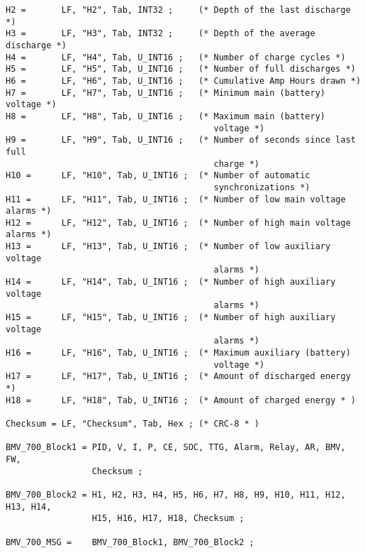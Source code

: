 \begin{verbatim}
H2 =       LF, "H2", Tab, INT32 ;     (* Depth of the last discharge *)
H3 =       LF, "H3", Tab, INT32 ;     (* Depth of the average discharge *)
H4 =       LF, "H4", Tab, U_INT16 ;   (* Number of charge cycles *)
H5 =       LF, "H5", Tab, U_INT16 ;   (* Number of full discharges *)
H6 =       LF, "H6", Tab, U_INT16 ;   (* Cumulative Amp Hours drawn *)
H7 =       LF, "H7", Tab, U_INT16 ;   (* Minimum main (battery) voltage *)
H8 =       LF, "H8", Tab, U_INT16 ;   (* Maximum main (battery) 
                                         voltage *)
H9 =       LF, "H9", Tab, U_INT16 ;   (* Number of seconds since last full
                                         charge *)
H10 =      LF, "H10", Tab, U_INT16 ;  (* Number of automatic 
                                         synchronizations *)
H11 =      LF, "H11", Tab, U_INT16 ;  (* Number of low main voltage alarms *)
H12 =      LF, "H12", Tab, U_INT16 ;  (* Number of high main voltage alarms *)
H13 =      LF, "H13", Tab, U_INT16 ;  (* Number of low auxiliary voltage 
                                         alarms *)
H14 =      LF, "H14", Tab, U_INT16 ;  (* Number of high auxiliary voltage 
                                         alarms *)
H15 =      LF, "H15", Tab, U_INT16 ;  (* Number of high auxiliary voltage 
                                         alarms *)
H16 =      LF, "H16", Tab, U_INT16 ;  (* Maximum auxiliary (battery) 
                                         voltage *)
H17 =      LF, "H17", Tab, U_INT16 ;  (* Amount of discharged energy *)
H18 =      LF, "H18", Tab, U_INT16 ;  (* Amount of charged energy * )

Checksum = LF, "Checksum", Tab, Hex ; (* CRC-8 * )

BMV_700_Block1 = PID, V, I, P, CE, SOC, TTG, Alarm, Relay, AR, BMV, FW, 
                 Checksum ;

BMV_700_Block2 = H1, H2, H3, H4, H5, H6, H7, H8, H9, H10, H11, H12, H13, H14, 
                 H15, H16, H17, H18, Checksum ;

BMV_700_MSG =    BMV_700_Block1, BMV_700_Block2 ;
\end{verbatim}
\newpage



